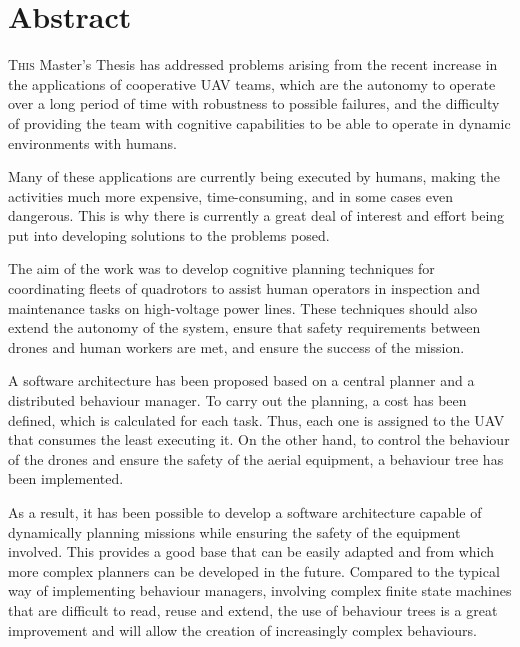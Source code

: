 \chapter*{Abstract}
\pagestyle{especial}
{}

\lettrine[lraise=-0.1, lines=2, loversize=0.2]{T}{his} Master's Thesis has addressed problems arising from the recent increase in the applications of cooperative \gls{UAV} teams, which are the autonomy to operate over a long period of time with robustness to possible failures, and the difficulty of providing the team with cognitive capabilities to be able to operate in dynamic environments with humans.

Many of these applications are currently being executed by humans, making the activities much more expensive, time-consuming, and in some cases even dangerous. This is why there is currently a great deal of interest and effort being put into developing solutions to the problems posed. 

The aim of the work was to develop cognitive planning techniques for coordinating fleets of quadrotors to assist human operators in inspection and maintenance tasks on high-voltage power lines. These techniques should also extend the autonomy of the system, ensure that safety requirements between drones and human workers are met, and ensure the success of the mission.

A software architecture has been proposed based on a central planner and a distributed behaviour manager. To carry out the planning, a cost has been defined, which is calculated for each task. Thus, each one is assigned to the \gls{UAV} that consumes the least executing it. On the other hand, to control the behaviour of the drones and ensure the safety of the aerial equipment, a behaviour tree has been implemented.

As a result, it has been possible to develop a software architecture capable of dynamically planning missions while ensuring the safety of the equipment involved. This provides a good base that can be easily adapted and from which more complex planners can be developed in the future. Compared to the typical way of implementing behaviour managers, involving complex finite state machines that are difficult to read, reuse and extend, the use of behaviour trees is a great improvement and will allow the creation of increasingly complex behaviours.

